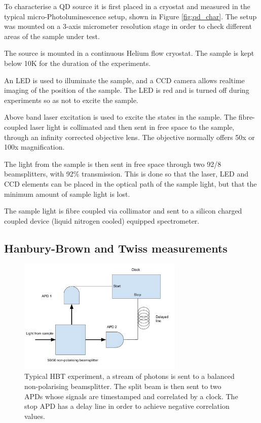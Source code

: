 To characterise a QD source it is first placed in a cryostat and measured in the
typical micro-Photoluminescence setup, shown in Figure \ref{fig:qd_char}. The
setup was mounted on  a 3-axis micrometer resolution stage in order to check
different areas of the sample under test.

The source is mounted in a continuous Helium flow cryostat. The sample is kept
below 10K for the duration of the experiments.

An LED is used to illuminate the sample, and a CCD camera allows realtime
imaging of the position of the sample. The LED is red and is turned off during
experiments so as not to excite the sample.

Above band laser excitation is used to excite the states in the sample. The
fibre-coupled laser light is collimated and then sent in free space to the
sample, through an infinity corrected objective lens. The objective normally
offers 50x or 100x magnification.

The light from the sample is then sent in free space through two 92/8
beamsplitters, with 92\% transmission. This is done so that the laser, LED and
CCD elements can be placed in the optical path of the sample light, but that the
minimum amount of sample light is lost.

The sample light is fibre coupled via collimator and sent to a silicon
charged coupled device (liquid nitrogen cooled) equipped spectrometer.

\subsection{Hanbury-Brown and Twiss measurements}

\begin{figure}[h!] \begin{center}
\includegraphics[width=0.7\textwidth]{images/basic_hbt.pdf} \caption{ Typical
HBT experiment, a stream of photons is sent to a balanced non-polarising
beamsplitter. The split beam is then sent to two APDs whose signals are
timestamped and correlated by a clock. The stop APD has a delay line in order to
achieve negative correlation values. } \label{fig:basic_hbt} \end{center}
\end{figure}

